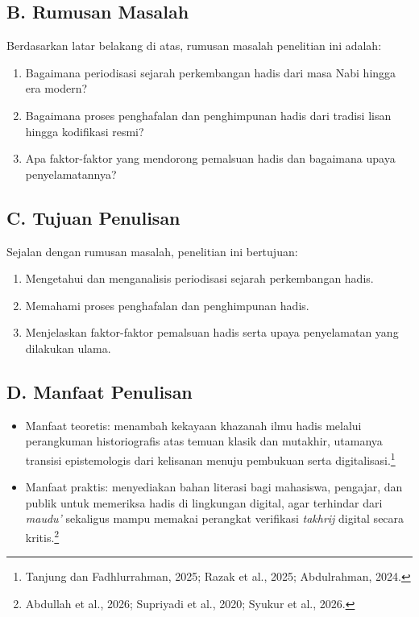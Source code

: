 \subsection*{B. Rumusan Masalah}

Berdasarkan latar belakang di atas, rumusan masalah penelitian ini adalah:

\begin{enumerate}[leftmargin=1.27cm,itemsep=2pt,parsep=2pt]
\item Bagaimana periodisasi sejarah perkembangan hadis dari masa Nabi hingga era modern?

\item Bagaimana proses penghafalan dan penghimpunan hadis dari tradisi lisan hingga kodifikasi resmi?

\item Apa faktor-faktor yang mendorong pemalsuan hadis dan bagaimana upaya penyelamatannya?

\end{enumerate}
\subsection*{C. Tujuan Penulisan}

Sejalan dengan rumusan masalah, penelitian ini bertujuan:

\begin{enumerate}[leftmargin=1.27cm,itemsep=2pt,parsep=2pt]
\item Mengetahui dan menganalisis periodisasi sejarah perkembangan hadis.

\item Memahami proses penghafalan dan penghimpunan hadis.

\item Menjelaskan faktor-faktor pemalsuan hadis serta upaya penyelamatan yang dilakukan ulama.

\end{enumerate}
\subsection*{D. Manfaat Penulisan}

\begin{itemize}[leftmargin=1.27cm,itemsep=2pt,parsep=2pt]
\item Manfaat teoretis: menambah kekayaan khazanah ilmu hadis melalui perangkuman historiografis atas temuan klasik dan mutakhir, utamanya transisi epistemologis dari kelisanan menuju pembukuan serta digitalisasi.\footnote{Tanjung dan Fadhlurrahman, 2025; Razak et al., 2025; Abdulrahman, 2024.}

\item Manfaat praktis: menyediakan bahan literasi bagi mahasiswa, pengajar, dan publik untuk memeriksa hadis di lingkungan digital, agar terhindar dari \textit{maudu'} sekaligus mampu memakai perangkat verifikasi \textit{takhrij} digital secara kritis.\footnote{Abdullah et al., 2026; Supriyadi et al., 2020; Syukur et al., 2026.}

\end{itemize}
